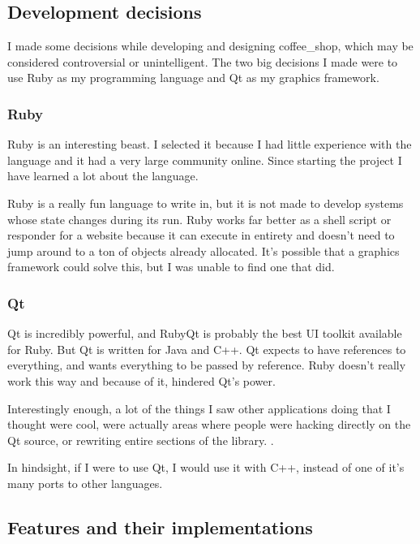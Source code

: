 \documentclass[10pt]{article}
\begin{document}
\subsection{Development decisions}

I made some decisions while developing and designing coffee\_shop, which may be considered controversial or unintelligent. The two big decisions I made were to use Ruby as my programming language and Qt as my graphics framework.

\subsubsection{Ruby}

Ruby is an interesting beast. I selected it because I had little experience with the language and it had a very large community online. Since starting the project I have learned a lot about the language.

Ruby is a really fun language to write in, but it is not made to develop systems whose state changes during its run. Ruby works far better as a shell script or responder for a website because it can execute in entirety and doesn't need to jump around to a ton of objects already allocated. It's possible that a graphics framework could solve this, but I was unable to find one that did.

\subsubsection{Qt}

Qt is incredibly powerful, and RubyQt \cite{rubyqt} is probably the best UI toolkit available for Ruby. But Qt is written for Java and C++. Qt expects to have references to everything, and wants everything to be passed by reference. Ruby doesn't really work this way and because of it, hindered Qt's power.

Interestingly enough, a lot of the things I saw other applications doing that I thought were cool, were actually areas where people were hacking directly on the Qt source, or rewriting entire sections of the library. \cite{kwrite}.

In hindsight, if I were to use Qt, I would use it with C++, instead of one of it's many ports to other languages.

\subsection{Features and their implementations}
\end{document}
